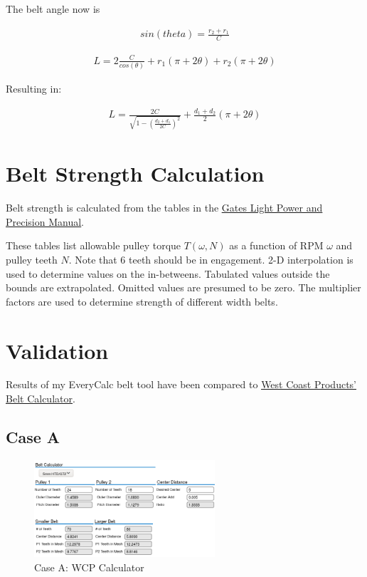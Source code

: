 \documentclass[10pt,letterpaper]{article}
\begin{document}
	The belt angle now is

	\begin{align}
		sin(theta) = \frac{r_2 + r_1}{C} 
	\end{align}

	\begin{align}
		L = 2 \frac{C}{cos(\theta)} + r_1 (\pi + 2 \theta) + r_2 (\pi + 2 \theta)
	\end{align}

	Resulting in:

	\begin{align}
		L = \frac{2 C}{\sqrt{1 - (\frac{d_2 + d_1}{2 C})^2}} + \frac{d_1 + d_2}{2} (\pi + 2 \theta)
	\end{align}

	\section*{Belt Strength Calculation}

	Belt strength is calculated from the tables in the \href{https://www.gates.com/content/dam/gates/home/resources/resource-library/catalogs/light-power-and-precision-manual.pdf}{\underline{Gates Light Power and Precision Manual}}.

	These tables list allowable pulley torque $T(\omega, N)$ as a function of RPM $\omega$ and pulley teeth $N$. Note that 6 teeth should be in engagement.
	2-D interpolation is used to determine values on the in-betweens.
	Tabulated values outside the bounds are extrapolated. Omitted values are presumed to be zero.
	The multiplier factors are used to determine strength of different width belts.

	\newpage

	\section*{Validation}

	Results of my EveryCalc belt tool have been compared to \href{https://www.wcproducts.com/how-to-belts/}{\underline{West Coast Products' Belt Calculator}}.

	\subsection*{Case A}

	\begin{figure}[H]
		\includegraphics[width=0.60\textwidth]{validation/belts_WCP_A.png}
		\caption{Case A: WCP Calculator}
	\end{figure}
\end{document}
